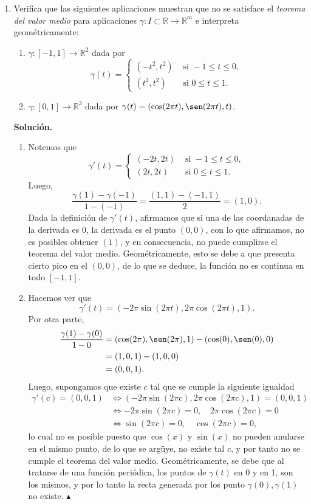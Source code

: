 \documentclass[12pt]{article}
\newcommand{\R}{\mathbb R}
\newcommand{\To}{\longrightarrow}
\begin{document}
\begin{enumerate}
\newpage
\item Verifica que las siguientes aplicaciones muestran que no se satisface el \emph{teorema del valor medio} para aplicaciones $\gamma:I\subset \R\To \R^m$ e interpreta geom\'etricamente:
\begin{enumerate}[(1)]
\item $\gamma:[-1,1]\To \R^2$ dada por
$$
\gamma(t) = 
\begin{cases}
(-t^2,t^2) & \text{ si } -1\leq t\leq 0, \\
(t^2,t^2) & \text{ si } 0\leq t\leq 1.
\end{cases}
$$
\item $\gamma:[0,1]\To \R^3$ dada por $\gamma(t)=(\cos(2\pi t),\sen(2\pi t),t)$.
\end{enumerate}
\textbf{Solución.}
\begin{enumerate}
    \item Notemos que
    \[
        \gamma'(t) = 
        \begin{cases}
            (-2t,2t) & \text{ si } -1\leq t\leq 0, \\
            (2t,2t) & \text{ si } 0\leq t\leq 1.
        \end{cases}
    \]
    Luego,
    \[
    \frac{\gamma(1)-\gamma(-1)}{1-(-1)} = \frac{(1,1)-(-1,1)}{2} = (1,0). \tag{1}
    \]
    Dada la definición de $\gamma'(t)$, afirmamos que si una de las coordanadas de la derivada es 0, la derivada es el punto $(0,0)$,
    con lo que afirmamos, no es posibles obtener $(1)$, y en consecuencia, no puede cumplirse el teorema del valor medio. Geométricamente, esto se debe a que presenta cierto pico en el $(0,0)$,
    de lo que se deduce, la función no es continua en todo $[-1,1]$.
    \item Hacemos ver que
    \[
    \gamma'(t)=(-2\pi\sin(2\pi t),2\pi\cos(2\pi t),1).
    \]
    Por otra parte,
    \begin{align*}
        \frac{\gamma(1)-\gamma(0)}{1-0} &= (\cos(2\pi),\sen(2\pi),1) - (\cos(0),\sen(0),0) \\
        &= (1,0,1)-(1,0,0) \\
        &= (0,0,1).
    \end{align*}
    Luego, supongamos que existe $c$ tal que se cumple la siguiente igualdad
    \begin{align*}
        \gamma'(c)=(0,0,1) &\iff (-2\pi\sin(2\pi c),2\pi\cos(2\pi c),1)=(0,0,1) \\
        &\iff -2\pi\sin(2\pi c)=0, \quad 2\pi\cos(2\pi c)=0 \\
        &\iff \sin(2\pi c)=0, \quad \cos(2\pi c)=0,
    \end{align*}
    lo cual no es posible puesto que $\cos(x)$ y $\sin(x)$ no pueden anularse en el mismo punto, de lo que se argüye, no existe tal $c$, y por tanto
    no se cumple el teorema del valor medio. Geométricamente, se debe que al tratarse de una función periódica, los puntos de $\gamma(t)$ en 0 y en 1, son los mismos,
    y por lo tanto la recta generada por los punto $\gamma(0),\gamma(1)$ no existe. \hfill $\blacktriangle$
\end{enumerate}

\end{enumerate}
\end{document}
